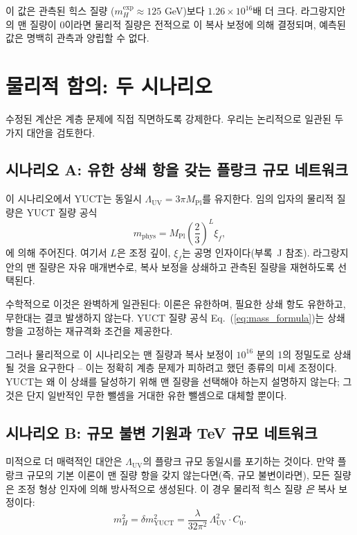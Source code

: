 \documentclass[11pt,a4paper]{article}
\newcommand{\Mpl}{M_{\mathrm{Pl}}}
\newcommand{\LUV}{\Lambda_{\mathrm{UV}}}
\theoremstyle{remark}
\begin{document}
	이 값은 관측된 힉스 질량 (\(m_H^{\mathrm{exp}} \approx 125\) GeV)보다 \(1.26 \times 10^{16}\)배 더 크다. 라그랑지안의 맨 질량이 0이라면 물리적 질량은 전적으로 이 복사 보정에 의해 결정되며, 예측된 값은 명백히 관측과 양립할 수 없다.
	
	\section{물리적 함의: 두 시나리오}
	\label{sec:scenarios}
	
	수정된 계산은 계층 문제에 직접 직면하도록 강제한다. 우리는 논리적으로 일관된 두 가지 대안을 검토한다.
	
	\subsection{시나리오 A: 유한 상쇄 항을 갖는 플랑크 규모 네트워크}
	
	이 시나리오에서 YUCT는 동일시 \(\LUV = 3\pi\Mpl\)를 유지한다. 임의 입자의 물리적 질량은 YUCT 질량 공식
	\begin{equation}
		m_{\mathrm{phys}} = \Mpl \left(\frac{2}{3}\right)^L \xi_f,
		\label{eq:mass_formula}
	\end{equation}
	에 의해 주어진다. 여기서 \(L\)은 조정 깊이, \(\xi_f\)는 공명 인자이다(부록~J 참조). 라그랑지안의 맨 질량은 자유 매개변수로, 복사 보정을 상쇄하고 관측된 질량을 재현하도록 선택된다.
	
	수학적으로 이것은 완벽하게 일관된다: 이론은 유한하며, 필요한 상쇄 항도 유한하고, 무한대는 결코 발생하지 않는다. YUCT 질량 공식 Eq.~(\ref{eq:mass_formula})는 상쇄 항을 고정하는 재규격화 조건을 제공한다.
	
	그러나 물리적으로 이 시나리오는 맨 질량과 복사 보정이 \(10^{16}\) 분의 1의 정밀도로 상쇄될 것을 요구한다 – 이는 정확히 계층 문제가 피하려고 했던 종류의 미세 조정이다. YUCT는 왜 이 상쇄를 달성하기 위해 맨 질량을 선택해야 하는지 설명하지 않는다; 그것은 단지 일반적인 무한 뺄셈을 거대한 유한 뺄셈으로 대체할 뿐이다.
	
	\subsection{시나리오 B: 규모 불변 기원과 TeV 규모 네트워크}
	
	미적으로 더 매력적인 대안은 \(\LUV\)의 플랑크 규모 동일시를 포기하는 것이다. 만약 플랑크 규모의 기본 이론이 맨 질량 항을 갖지 않는다면(즉, 규모 불변이라면), 모든 질량은 조정 형상 인자에 의해 방사적으로 생성된다. 이 경우 물리적 힉스 질량 \emph{은} 복사 보정이다:
	\begin{equation}
		m_H^2 = \delta m^2_{\mathrm{YUCT}} = \frac{\lambda}{32\pi^2}\,\LUV^2 \cdot C_0.
		\label{eq:scale_inv}
	\end{equation}
	
\end{document}
